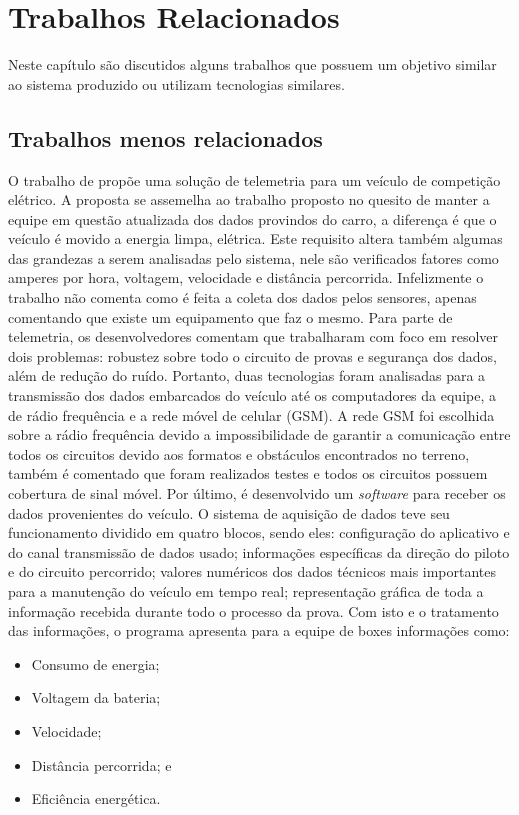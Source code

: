 \chapter{Trabalhos Relacionados}
	\label{ch:trabalhos}
Neste capítulo são discutidos alguns trabalhos que possuem um objetivo similar ao sistema produzido ou utilizam tecnologias similares. 

\section{Trabalhos menos relacionados}

O trabalho de  propõe uma solução de telemetria para um veículo de competição elétrico. A proposta se assemelha ao trabalho proposto no quesito de manter a equipe em questão atualizada dos dados provindos do carro, a diferença é que o veículo é movido a energia limpa, elétrica. Este requisito altera também algumas das grandezas a serem analisadas pelo sistema, nele são verificados fatores como amperes por hora, voltagem, velocidade e distância percorrida. Infelizmente o trabalho não comenta como é feita a coleta dos dados pelos sensores, apenas comentando que existe um equipamento que faz o mesmo. Para parte de telemetria, os desenvolvedores comentam que trabalharam com foco em resolver dois problemas: robustez sobre todo o circuito de provas e segurança dos dados, além de redução do ruído. Portanto, duas tecnologias foram analisadas para a transmissão dos dados embarcados do veículo até os computadores da equipe, a de rádio frequência e a rede móvel de celular (GSM). A rede GSM foi escolhida sobre a rádio frequência devido a impossibilidade de garantir a comunicação entre todos os circuitos devido aos formatos e obstáculos encontrados no terreno, também é comentado que foram realizados testes e todos os circuitos possuem cobertura de sinal móvel. Por último, é desenvolvido um \textit{software} para receber os dados provenientes do veículo. O sistema de aquisição de dados teve seu funcionamento dividido em quatro blocos, sendo eles: configuração do aplicativo e do canal transmissão de dados usado; informações específicas da direção do piloto e do circuito percorrido; valores numéricos dos dados técnicos mais importantes para a manutenção do veículo em tempo real; representação gráfica de toda a informação recebida durante todo o processo da prova. Com isto e o tratamento das informações, o programa apresenta para a equipe de boxes informações como:

\begin{itemize}
	\item Consumo de energia; 
	\item Voltagem da bateria;
	\item Velocidade;
	\item Distância percorrida; e
	\item Eficiência energética.
\end{itemize}

